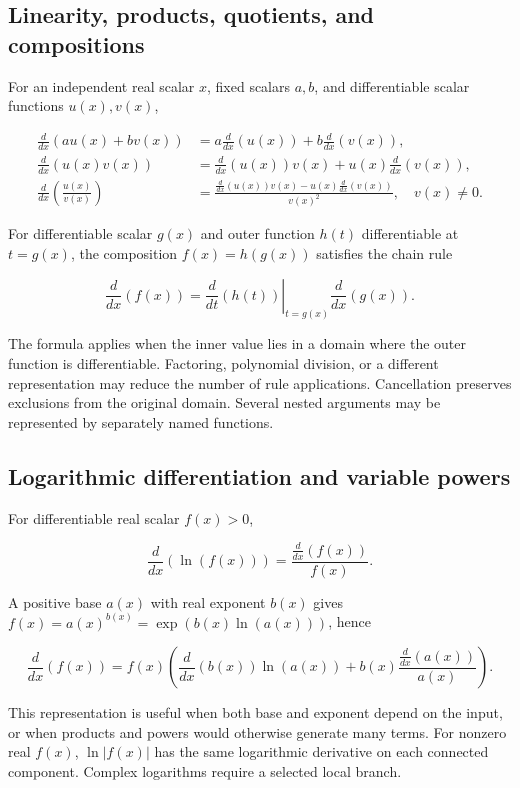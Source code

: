 \documentclass[11pt,oneside,openany]{book}
\begin{document}
\par\addvspace{8pt}\noindent\begin{minipage}{\linewidth}
\subsection{Linearity, products, quotients, and compositions}

For an independent real scalar \(x\), fixed scalars \(a,b\), and differentiable
scalar functions \(u(x),v(x)\),

\[
\begin{aligned}
\frac{d}{dx}\left(au(x)+bv(x)\right)&=a\frac{d}{dx}\left(u(x)\right)+b\frac{d}{dx}\left(v(x)\right),\\
\frac{d}{dx}\left(u(x)v(x)\right)&=\frac{d}{dx}\left(u(x)\right)v(x)+u(x)\frac{d}{dx}\left(v(x)\right),\\
\frac{d}{dx}\left(\frac{u(x)}{v(x)}\right)&=\frac{\frac{d}{dx}(u(x))v(x)-u(x)\frac{d}{dx}(v(x))}{v(x)^2},\quad v(x)\ne0.
\end{aligned}
\]

For differentiable scalar \(g(x)\) and outer function \(h(t)\) differentiable at
\(t=g(x)\), the composition \(f(x)=h(g(x))\) satisfies the chain rule

\[
\frac{d}{dx}\left(f(x)\right)
=\left.\frac{d}{dt}\left(h(t)\right)\right|_{t=g(x)}\frac{d}{dx}\left(g(x)\right).
\]

The formula applies when the inner value lies in a domain where the outer function is differentiable.
Factoring, polynomial division, or a different representation may reduce the
number of rule applications. Cancellation preserves exclusions from the original
domain. Several nested arguments may be represented by separately named functions.

\end{minipage}\par
\par\addvspace{8pt}\noindent\begin{minipage}{\linewidth}
\subsection{Logarithmic differentiation and variable powers}

For differentiable real scalar \(f(x)>0\),

\[
\frac{d}{dx}\left(\ln(f(x))\right)=\frac{\frac{d}{dx}(f(x))}{f(x)}.
\]

A positive base \(a(x)\) with real exponent \(b(x)\) gives
\(f(x)=a(x)^{b(x)}=\exp(b(x)\ln(a(x)))\), hence

\[
\frac{d}{dx}\left(f(x)\right)
=f(x)\left(\frac{d}{dx}(b(x))\ln(a(x))
+b(x)\frac{\frac{d}{dx}(a(x))}{a(x)}\right).
\]

This representation is useful when both base and exponent depend on the input,
or when products and powers would otherwise generate many terms. For nonzero
real \(f(x)\), \(\ln|f(x)|\) has the same logarithmic derivative on each connected
component. Complex logarithms require a selected local branch.

\end{minipage}\par
\end{document}
